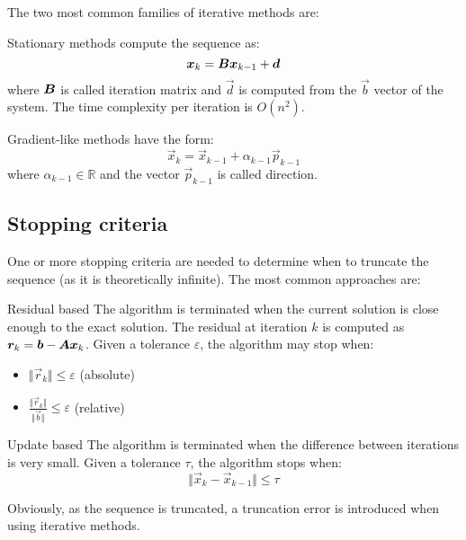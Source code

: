The two most common families of iterative methods are:
\begin{descriptionlist}
    \item[Stationary methods] 
        compute the sequence as:
        \[ {\bm{x}}_k = {\bm{B}}{\bm{x}}_{k-1} + {\bm{d}} \]
        where ${\bm{B}}$ is called iteration matrix and $\vec{d}$ is computed from the $\vec{b}$ vector of the system.
        The time complexity per iteration is $O(n^2)$.
    
    \item[Gradient-like methods] 
        have the form:
        \[ \vec{x}_k = \vec{x}_{k-1} + \alpha_{k-1}\vec{p}_{k-1} \]
        where $\alpha_{k-1} \in \mathbb{R}$ and the vector $\vec{p}_{k-1}$ is called direction.
\end{descriptionlist}

\subsection{Stopping criteria}
One or more stopping criteria are needed to determine when to truncate the sequence (as it is theoretically infinite).
The most common approaches are:
\begin{descriptionlist}
    \item[Residual based]
        The algorithm is terminated when the current solution is close enough to the exact solution.
        The residual at iteration $k$ is computed as ${\bm{r}}_k = {\bm{b}} - {\bm{A}}{\bm{x}}_k$.
        Given a tolerance $\varepsilon$, the algorithm may stop when:
        \begin{itemize}
            \item $\Vert \vec{r}_k \Vert \leq \varepsilon$ (absolute)
            \item $\frac{\Vert \vec{r}_k \Vert}{\Vert \vec{b} \Vert} \leq \varepsilon$ (relative)
        \end{itemize}

    \item[Update based] 
        The algorithm is terminated when the difference between iterations is very small.
        Given a tolerance $\tau$, the algorithm stops when:
        \[ \Vert \vec{x}_{k} - \vec{x}_{k-1} \Vert \leq \tau \]
\end{descriptionlist}
Obviously, as the sequence is truncated, a truncation error is introduced when using iterative methods.



